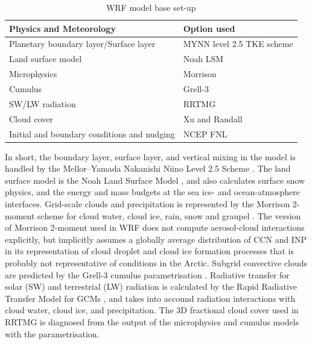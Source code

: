 \begin{table}[ht!]
    \centering
    \begin{tabular}{m{}m{}}
    \toprule
    \textbf{Physics and Meteorology}  &  \textbf{Option used} \\
    \midrule 
    Planetary boundary layer/Surface layer & MYNN level 2.5 TKE scheme \citep{nakanishi_development_2009} \\
    Land surface model & Noah LSM \citep{tewari_implementation_2004} \\
    Microphysics & Morrison \citep{morrison_impact_2009} \\
    Cumulus & Grell-3 \citep{grell_generalized_2002} \\
    SW/LW radiation & RRTMG \citep{iacono_radiative_2008} \\
    Cloud cover & Xu and Randall \citep{xu_semiempirical_1996} \\
    Initial and boundary conditions and nudging & NCEP FNL \citep{commerce_ncep_2000}\\
    \bottomrule
    \end{tabular}
    \caption{WRF model base set-up}
    \label{tab:wrf_set-up}
\end{table}

    In short, the boundary layer, surface layer, and vertical mixing in the model is handled by the Mellor–Yamada Nakanishi Niino Level 2.5 Scheme  \citep{nakanishi_development_2009}. The land surface model is the Noah Land Surface Model \citep{tewari_implementation_2004}, and also calculates surface snow physics, and the energy and mass budgets at the sea ice- and ocean-atmosphere interfaces.  Grid-scale clouds and precipitation is represented by the Morrison 2-moment scheme for cloud water, cloud ice, rain, snow and graupel \citep{morrison_impact_2009}. The version of Morrison 2-moment used in WRF does not compute aerosol-cloud interactions explicitly, but implicitly assumes a globally average distribution of CCN and INP in its representation of cloud droplet and cloud ice formation processes that is probably not representative of conditions in the Arctic. Subgrid convective clouds are predicted by the Grell-3 cumulus parametrisation \citep{grell_generalized_2002}. 
    Radiative transfer for solar (SW) and terrestrial (LW) radiation is calculated by the Rapid Radiative Transfer Model for GCMs \citep{iacono_radiative_2008}, and takes into accound radiation interactions with cloud water, cloud ice, and precipitation. The 3D fractional cloud cover used in RRTMG is diagnosed from the output of the microphysics and cumulus models with the \citet{xu_semiempirical_1996} parametrisation.
    
